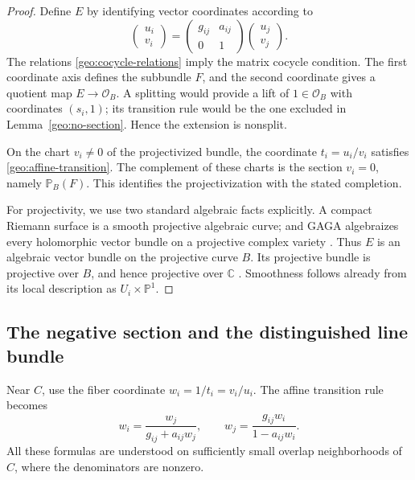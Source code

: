 \documentclass[11pt,a4paper]{article}
\numberwithin{equation}{section}
\theoremstyle{definition}
\theoremstyle{remark}
\newcommand{\C}{\mathbb C}
\renewcommand{\P}{\mathbb P}
\newcommand{\OO}{\mathcal O}
\begin{document}
\begin{proof}
Define $E$ by identifying vector coordinates according to
\[
  \begin{pmatrix}u_i\\v_i\end{pmatrix}
  =
  \begin{pmatrix}g_{ij}&a_{ij}\\0&1\end{pmatrix}
  \begin{pmatrix}u_j\\v_j\end{pmatrix}.
\]
The relations \eqref{geo:cocycle-relations} imply the matrix cocycle
condition.  The first coordinate axis defines the subbundle $F$,
and the second coordinate gives a quotient map $E\to\OO_B$.
A splitting would provide a lift of $1\in\OO_B$ with coordinates
$(s_i,1)$; its transition rule would be the one excluded in
Lemma~\ref{geo:no-section}.  Hence the extension is nonsplit.

On the chart $v_i\ne0$ of the projectivized bundle, the coordinate
$t_i=u_i/v_i$ satisfies \eqref{geo:affine-transition}.  The complement
of these charts is the section $v_i=0$, namely $\P_B(F)$.  This
identifies the projectivization with the stated completion.

For projectivity, we use two standard algebraic facts explicitly.
A compact Riemann surface is a smooth projective algebraic curve;
and GAGA algebraizes every holomorphic vector bundle on a projective
complex variety \cite{Serre1956}.  Thus $E$ is an algebraic vector
bundle on the projective curve $B$.  Its projective bundle is
projective over $B$, and hence projective over $\C$
\cite{Hartshorne1977}.  Smoothness follows already from its local
description as $U_i\times\P^1$.
\end{proof}

\subsection{The negative section and the distinguished line bundle}

Near $C$, use the fiber coordinate $w_i=1/t_i=v_i/u_i$.  The affine
transition rule becomes
\begin{equation}\label{geo:normal-transition}
  w_i=\frac{w_j}{g_{ij}+a_{ij}w_j},\qquad
  w_j=\frac{g_{ij}w_i}{1-a_{ij}w_i}.
\end{equation}
All these formulas are understood on sufficiently small overlap
neighborhoods of $C$, where the denominators are nonzero.
\end{document}
